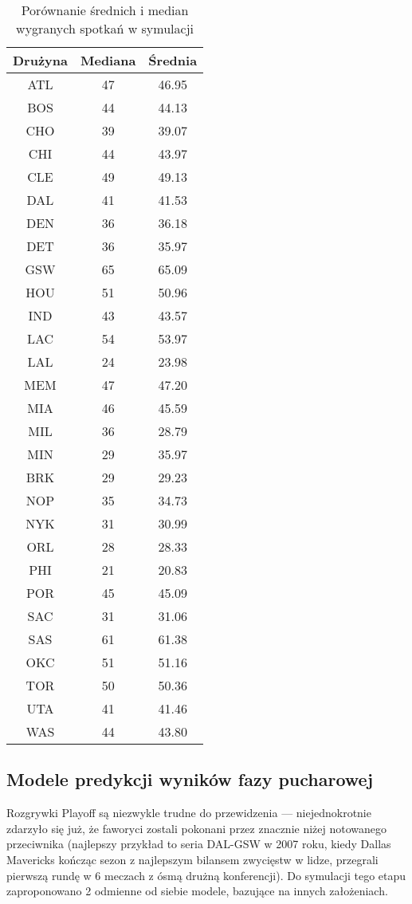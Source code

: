 \documentclass[inzynierska]{pwr_wmat_praca_dyplomowa}
\theoremstyle{plain}
\numberwithin{theorem}{chapter}
\theoremstyle{definition}
\numberwithin{theorem}{chapter}
\begin{document}
\begin{table}[]
	\centering
	\begin{tabular}{|c|c|c|}
		\hline
		\textbf{Drużyna}      & \textbf{Mediana} & \textbf{Średnia} \\ \hline
		ATL & 47 & 46.95\\ \hline
		BOS & 44 & 44.13\\ \hline
		CHO & 39 & 39.07\\ \hline
		CHI & 44 & 43.97\\ \hline
		CLE & 49 & 49.13\\ \hline
		DAL & 41 & 41.53\\ \hline
		DEN & 36 & 36.18\\ \hline
		DET & 36 & 35.97\\ \hline
		GSW & 65 & 65.09\\ \hline
		HOU & 51 & 50.96\\ \hline
		IND & 43 & 43.57\\ \hline
		LAC & 54 & 53.97\\ \hline
		LAL & 24 & 23.98\\ \hline
		MEM & 47 & 47.20\\ \hline
		MIA & 46 & 45.59\\ \hline
		MIL & 36 & 28.79\\ \hline
		MIN & 29 & 35.97\\ \hline
		BRK & 29 & 29.23\\ \hline
		NOP & 35 & 34.73\\ \hline
		NYK & 31 & 30.99\\ \hline
		ORL & 28 & 28.33\\ \hline
		PHI & 21 & 20.83\\ \hline
		POR & 45 & 45.09\\ \hline
		SAC & 31 & 31.06\\ \hline
		SAS & 61 & 61.38\\ \hline
		OKC & 51 & 51.16\\ \hline
		TOR & 50 & 50.36\\ \hline
		UTA & 41 & 41.46\\ \hline
		WAS & 44 & 43.80\\ \hline
	\end{tabular}
\caption{Porównanie średnich i median wygranych spotkań w symulacji}\label{srednie_mediany}	
\end{table}
\subsection{Modele predykcji wyników fazy pucharowej}\label{modele_palyoff}
Rozgrywki Playoff są niezwykle trudne do przewidzenia --- niejednokrotnie zdarzyło się już, że faworyci zostali pokonani przez znacznie niżej notowanego przeciwnika (najlepszy przykład to seria DAL-GSW w 2007 roku, kiedy Dallas Mavericks kończąc sezon z najlepszym bilansem zwycięstw w lidze, przegrali pierwszą rundę w 6 meczach z ósmą drużną konferencji).
Do symulacji tego etapu zaproponowano 2 odmienne od siebie modele, bazujące na innych założeniach.
\end{document}
